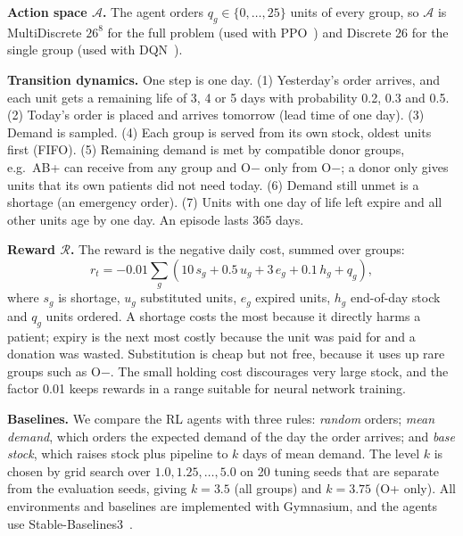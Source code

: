 \textbf{Action space $\mathcal{A}$.} The agent orders $q_g \in \{0,\dots,25\}$ units of every group, so $\mathcal{A}$ is MultiDiscrete $26^8$ for the full problem (used with PPO~\cite{schulman2017ppo}) and Discrete 26 for the single group (used with DQN~\cite{mnih2015dqn}).

\textbf{Transition dynamics.} One step is one day. (1) Yesterday's order arrives, and each unit gets a remaining life of 3, 4 or 5 days with probability 0.2, 0.3 and 0.5. (2) Today's order is placed and arrives tomorrow (lead time of one day). (3) Demand is sampled. (4) Each group is served from its own stock, oldest units first (FIFO). (5) Remaining demand is met by compatible donor groups, e.g.\ AB+ can receive from any group and O$-$ only from O$-$; a donor only gives units that its own patients did not need today. (6) Demand still unmet is a shortage (an emergency order). (7) Units with one day of life left expire and all other units age by one day. An episode lasts 365 days.

\textbf{Reward $\mathcal{R}$.} The reward is the negative daily cost, summed over groups:
\begin{equation}
r_t = -0.01 \sum_{g} \left( 10\,s_g + 0.5\,u_g + 3\,e_g + 0.1\,h_g + q_g \right),
\end{equation}
where $s_g$ is shortage, $u_g$ substituted units, $e_g$ expired units, $h_g$ end-of-day stock and $q_g$ units ordered. A shortage costs the most because it directly harms a patient; expiry is the next most costly because the unit was paid for and a donation was wasted. Substitution is cheap but not free, because it uses up rare groups such as O$-$. The small holding cost discourages very large stock, and the factor 0.01 keeps rewards in a range suitable for neural network training.

\textbf{Baselines.} We compare the RL agents with three rules: \emph{random} orders; \emph{mean demand}, which orders the expected demand of the day the order arrives; and \emph{base stock}, which raises stock plus pipeline to $k$ days of mean demand. The level $k$ is chosen by grid search over $1.0,1.25,\dots,5.0$ on 20 tuning seeds that are separate from the evaluation seeds, giving $k=3.5$ (all groups) and $k=3.75$ (O+ only). All environments and baselines are implemented with Gymnasium, and the agents use Stable-Baselines3~\cite{raffin2021sb3}.
